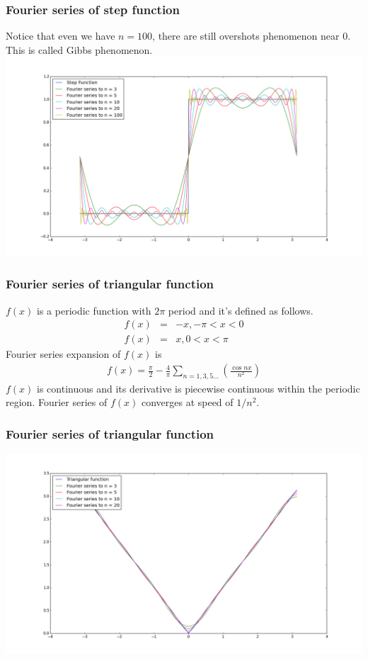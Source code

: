 \documentclass{beamer}
\begin{document}
\begin{frame}
\frametitle{Fourier series of step function}
Notice that even we have $n = 100$, there are still overshots phenomenon near 0. This is called Gibbs phenomenon.
\includegraphics[scale=0.3]{step.png}
\end{frame}
\begin{frame}
\frametitle{Fourier series of triangular function}
$f(x)$ is a periodic function with $2\pi$ period and it's defined as follows.
\begin{eqnarray}
f(x)&=& -x, -\pi < x < 0 \nonumber \\
f(x)&=& x, 0 < x < \pi
\label{eq:traiangularfunc}
\end{eqnarray}
Fourier series expansion of $f(x)$ is
\begin{eqnarray}
f(x)= \frac{\pi}{2} - \frac{4}{\pi} \sum_{n=1,3,5...} \left( \frac{\cos nx}{n^2} \right)
\label{eq:traiangularfunc_ft}
\end{eqnarray}
$f(x)$ is continuous and its derivative is piecewise continuous within the periodic region. Fourier series of $f(x)$ converges at speed of $1/n^2$.
\end{frame}
\begin{frame}
\frametitle{Fourier series of triangular function}
\includegraphics[scale=0.3]{triangular.png}
\end{frame}
\end{document}
